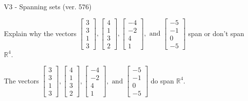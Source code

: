\begin{exercise}
  \begin{exerciseTitle}V3 - Spanning sets (ver. 576)\end{exerciseTitle}
  \begin{exerciseStatement}
    Explain why the vectors \(\left[\begin{array}{r}
3 \\
3 \\
1 \\
3
\end{array}\right] , \left[\begin{array}{r}
4 \\
1 \\
3 \\
2
\end{array}\right] , \left[\begin{array}{r}
-4 \\
-2 \\
4 \\
1
\end{array}\right] , \text{ and } \left[\begin{array}{r}
-5 \\
-1 \\
0 \\
-5
\end{array}\right]\) span or don't span \(\mathbb{R}^4\). 
	


  \end{exerciseStatement}
  \begin{exerciseAnswer}
   The vectors \(\left[\begin{array}{r}
3 \\
3 \\
1 \\
3
\end{array}\right] , \left[\begin{array}{r}
4 \\
1 \\
3 \\
2
\end{array}\right] , \left[\begin{array}{r}
-4 \\
-2 \\
4 \\
1
\end{array}\right] , \text{ and } \left[\begin{array}{r}
-5 \\
-1 \\
0 \\
-5
\end{array}\right]\) 
  	 do  
	span \(\mathbb{R}^4\).
  


  \end{exerciseAnswer}
\end{exercise}